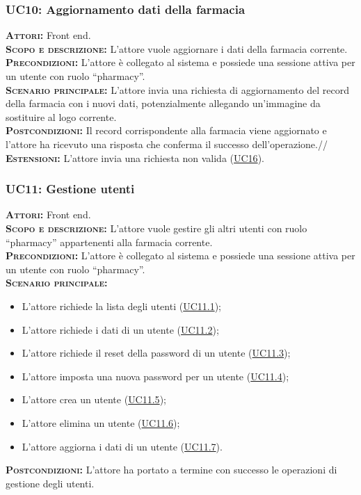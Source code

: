 \subsubsection{UC10: Aggiornamento dati della farmacia}
\label{sec:UC10}
\textsc{\textbf{Attori:}} Front end.\\
\textsc{\textbf{Scopo e descrizione:}} L'attore vuole aggiornare i dati della farmacia corrente.\\
\textsc{\textsc{\textbf{Precondizioni:}}} L'attore è collegato al sistema e possiede una sessione attiva per un utente con ruolo ``pharmacy''.\\
\textsc{\textbf{Scenario principale:}} L'attore invia una richiesta di aggiornamento del record della farmacia con i nuovi dati, potenzialmente allegando un'immagine da sostituire al logo corrente.\\
\textsc{\textbf{Postcondizioni:}} Il record corrispondente alla farmacia viene aggiornato e l'attore ha ricevuto una risposta che conferma il successo dell'operazione.//
\textsc{\textbf{Estensioni:}} L'attore invia una richiesta non valida (\hyperref[sec:UC16]{UC16}).


\subsubsection{UC11: Gestione utenti}
\label{sec:UC11}
\textsc{\textbf{Attori:}} Front end.\\
\textsc{\textbf{Scopo e descrizione:}} L'attore vuole gestire gli altri utenti con ruolo ``pharmacy'' appartenenti alla farmacia corrente.\\
\textsc{\textsc{\textbf{Precondizioni:}}} L'attore è collegato al sistema e possiede una sessione attiva per un utente con ruolo ``pharmacy''.\\
\textsc{\textbf{Scenario principale:}}
\begin{itemize}
    \item L'attore richiede la lista degli utenti (\hyperref[sec:UC111]{UC11.1});
    \item L'attore richiede i dati di un utente (\hyperref[sec:UC112]{UC11.2});
    \item L'attore richiede il reset della password di un utente (\hyperref[sec:UC113]{UC11.3});
    \item L'attore imposta una nuova password per un utente  (\hyperref[sec:UC114]{UC11.4});
    \item L'attore crea un utente (\hyperref[sec:UC115]{UC11.5});
    \item L'attore elimina un utente (\hyperref[sec:UC116]{UC11.6});
    \item L'attore aggiorna i dati di un utente (\hyperref[sec:UC117]{UC11.7}).
\end{itemize}
\textsc{\textbf{Postcondizioni:}} L'attore ha portato a termine con successo le operazioni di gestione degli utenti.

